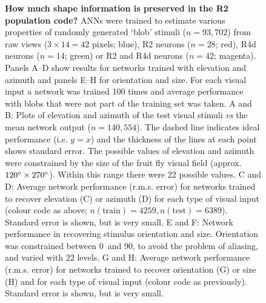 \begin{figure}[htp]
	\caption{
		{\bf How much shape information is preserved in the R2 population code?}
		ANNs were trained to estimate various properties of randomly generated `blob' stimuli ($n=93,702$) from raw views ($3\times 14 = 42$ pixels; blue), R2 neurons ($n=28$; red), R4d neurons ($n=14$; green) or R2 and R4d neurons ($n=42$; magenta). Panels A--D show results for networks trained with elevation and azimuth and panels E--H for orientation and size. For each visual input a network was trained 100 times and average performance with blobs that were not part of the training set was taken.
		A and B: Plots of elevation and azimuth of the test visual stimuli \emph{vs} the mean network output ($n=140,554$). The dashed line indicates ideal performance (i.e. $y=x$) and the thickness of the lines at each point shows standard error.
		The possible values of elevation and azimuth were constrained by the size of the fruit fly visual field (approx. $120\degree \times 270\degree$). Within this range there were 22 possible values.
		C and D: Average network performance (r.m.s. error) for networks trained to recover elevation (C) or azimuth (D) for each type of visual input (colour code as above; $n(\mathrm{train}) = 4259, n(\mathrm{test}) = 6389$). Standard error is shown, but is very small.
		E and F: Network performance in recovering stimulus orientation and size. Orientation was constrained between 0\degree\ and 90\degree, to avoid the problem of aliasing, and varied with 22 levels.
		G and H: Average network performance (r.m.s. error) for networks trained to recover orientation (G) or size (H) and for each type of visual input (colour code as previously). Standard error is shown, but is very small.
	}
	\label{fig:elazorsi}
\end{figure}

